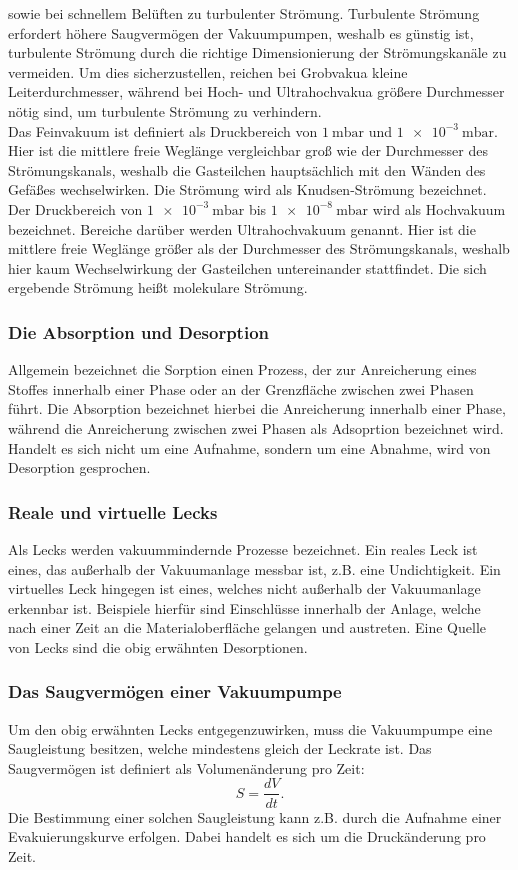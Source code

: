 sowie bei schnellem Belüften zu turbulenter Strömung. Turbulente Strömung erfordert
höhere Saugvermögen der Vakuumpumpen, weshalb es günstig ist, turbulente Strömung durch
die richtige Dimensionierung der Strömungskanäle zu vermeiden. Um dies sicherzustellen,
reichen bei Grobvakua kleine Leiterdurchmesser, während bei Hoch- und Ultrahochvakua
größere Durchmesser nötig sind, um turbulente Strömung zu verhindern.\\
Das Feinvakuum ist definiert als Druckbereich von $\SI{1}{\milli\bar}$ und $\SI{1e-3}{\milli\bar}$.
Hier ist die mittlere freie Weglänge vergleichbar groß wie der Durchmesser des Strömungskanals,
weshalb die Gasteilchen hauptsächlich mit den Wänden des Gefäßes wechselwirken.
Die Strömung wird als Knudsen-Strömung bezeichnet.
Der Druckbereich von $\SI{1e-3}{\milli\bar}$ bis $\SI{1e-8}{\milli\bar}$ wird als Hochvakuum
bezeichnet. Bereiche darüber werden Ultrahochvakuum genannt. Hier ist die mittlere freie
Weglänge größer als der Durchmesser des Strömungskanals, weshalb hier kaum Wechselwirkung
der Gasteilchen untereinander stattfindet. Die sich ergebende Strömung heißt molekulare Strömung.

\subsubsection*{Die Absorption und Desorption}
Allgemein bezeichnet die Sorption einen Prozess, der zur Anreicherung eines Stoffes
innerhalb einer Phase oder an der Grenzfläche zwischen zwei Phasen führt.
Die Absorption bezeichnet hierbei die Anreicherung innerhalb einer Phase, während die
Anreicherung zwischen zwei Phasen als Adsoprtion bezeichnet wird. Handelt es sich nicht
um eine Aufnahme, sondern um eine Abnahme, wird von Desorption gesprochen.

\subsubsection*{Reale und virtuelle Lecks}
Als Lecks werden vakuummindernde Prozesse bezeichnet. Ein reales Leck ist eines,
das außerhalb der Vakuumanlage messbar ist, z.B. eine Undichtigkeit. Ein virtuelles
Leck hingegen ist eines, welches nicht außerhalb der Vakuumanlage erkennbar ist.
Beispiele hierfür sind Einschlüsse innerhalb der Anlage, welche nach einer Zeit an
die Materialoberfläche gelangen und austreten.
Eine Quelle von Lecks sind die obig erwähnten Desorptionen.

\subsubsection*{Das Saugvermögen einer Vakuumpumpe}
Um den obig erwähnten Lecks entgegenzuwirken, muss die Vakuumpumpe eine Saugleistung
besitzen, welche mindestens gleich der Leckrate ist. Das Saugvermögen ist definiert
als Volumenänderung pro Zeit:
\begin{equation}
 S = \frac{dV}{dt}.
\end{equation}
Die Bestimmung einer solchen Saugleistung kann z.B. durch die Aufnahme einer
Evakuierungskurve erfolgen. Dabei handelt es sich um die Druckänderung pro Zeit.

